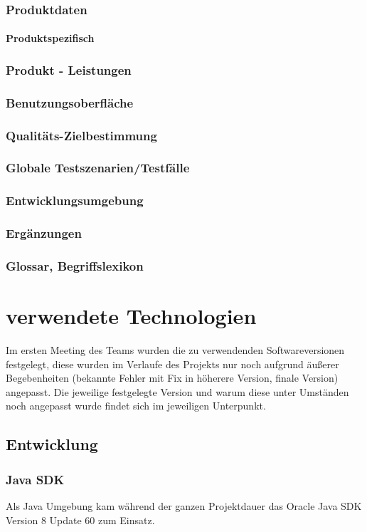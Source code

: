 \documentclass[12pt,a4paper]{scrreprt}
\begin{document}
\subsection{Produktdaten}
\subsubsection{Produktspezifisch}
\subsection{Produkt - Leistungen}
\subsection{Benutzungsoberfläche}
\subsection{Qualitäts-Zielbestimmung}
\subsection{Globale Testszenarien/Testfälle}
\subsection{Entwicklungsumgebung}
\subsection{Ergänzungen}
\subsection{Glossar, Begriffslexikon}
\chapter{verwendete Technologien}
Im ersten Meeting des Teams wurden die zu verwendenden Softwareversionen festgelegt, diese wurden im Verlaufe des Projekts nur noch aufgrund äußerer Begebenheiten (bekannte Fehler mit Fix in höherere Version, finale Version) angepasst. Die jeweilige festgelegte Version und warum diese unter Umständen noch angepasst wurde findet sich im jeweiligen Unterpunkt.
\section{Entwicklung}
\subsection{Java SDK}
Als Java Umgebung kam während der ganzen Projektdauer das Oracle Java SDK Version 8 Update 60 zum Einsatz.
\end{document}
